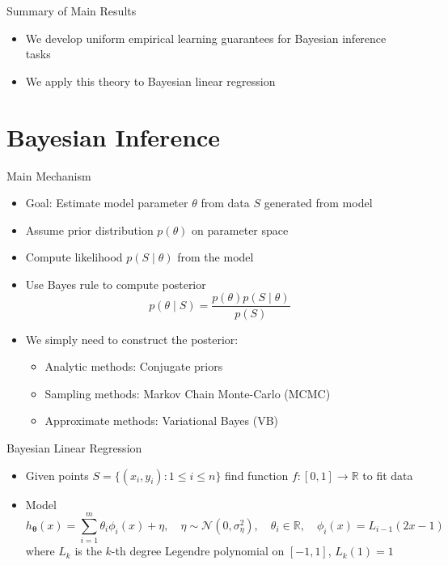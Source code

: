 \documentclass[aspectratio=169]{beamer}
\newcommand{\RR}{\mathbb{R}}
\begin{document}
\begin{frame}{Summary of Main Results}
	\begin{itemize}
		\item
      We develop uniform empirical learning guarantees for Bayesian inference
      tasks
    \item
      We apply this theory to Bayesian linear regression
	\end{itemize}
\end{frame}

\section{Bayesian Inference}

\begin{frame}{Main Mechanism}
  \begin{itemize}
    \item
      Goal: Estimate model parameter $\theta$ from data $S$ generated from model
    \item
      Assume prior distribution $p(\theta)$ on parameter space
    \item
      Compute likelihood $p(S \mid \theta)$ from the model
    \item
      Use Bayes rule to compute posterior
      \begin{equation*}
        p(\theta \mid S) = \frac{p(\theta) p(S \mid \theta)}{p(S)}
      \end{equation*}
    \item
      We simply need to construct the posterior:
      \begin{itemize}
        \item
          Analytic methods: Conjugate priors
        \item
          Sampling methods: Markov Chain Monte-Carlo (MCMC)
        \item
          Approximate methods: Variational Bayes (VB)
      \end{itemize}
  \end{itemize}
\end{frame}

\begin{frame}{Bayesian Linear Regression}
  \begin{itemize}
    \item
      Given points $S = \{(x_i, y_i) : 1 \leq i \leq n\}$ find function $f : [0,
      1] \to \RR$ to fit data
    \item
      Model
      \begin{equation*}
        h_{\bm{\theta}}(x) = \sum_{i = 1}^m \theta_i \phi_i(x) + \eta, \quad
        \eta \sim \mathcal{N}(0, \sigma_\eta^2), \quad \theta_i \in \RR, \quad
        \phi_i(x) = L_{i - 1}(2 x - 1)
      \end{equation*}
      where $L_k$ is the $k$-th degree Legendre polynomial on $[-1, 1]$, $L_k(1)
      = 1$
  \end{itemize}
\end{frame}
\end{document}
